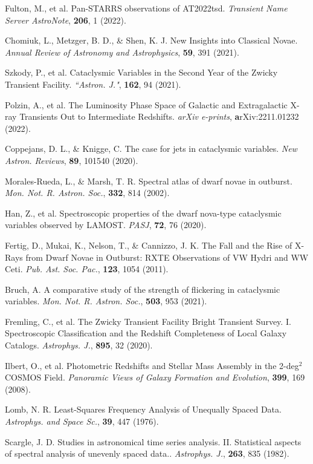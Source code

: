 \documentclass{nature_plusfigure}
\newcommand{\mn}{{Mon. Not. R. Astron. Soc.}}
\newcommand{\nar}{{New Astron. Reviews}}
\newcommand{\mnras}{\mn}
\newcommand{\aj}{{``Astron. J."}}
\newcommand{\apj}{{Astrophys. J.}}
\newcommand{\apss}{{Astrophys. and Space Sc.}}
\newcommand{\pasj}{{PASJ}}
\newcommand{\pasp}{{Pub. Ast. Soc. Pac.}}
\newcommand{\araa}{Annual Review of Astronomy and Astrophysics}
\begin{document}
\begin{methods}
\begin{thebibliography}{10}
 Fulton, M., et al. Pan-STARRS observations of AT2022tsd. \emph{Transient Name Server AstroNote}, \textbf{206}, 1 (2022). 

 Chomiuk, L., Metzger, B. D., \& Shen, K. J. New Insights into Classical Novae. \emph{\araa}, \textbf{59}, 391 (2021). 

 Szkody, P., et al. Cataclysmic Variables in the Second Year of the Zwicky Transient Facility. \emph{\aj}, \textbf{162}, 94 (2021). 

 Polzin, A., et al. The Luminosity Phase Space of Galactic and Extragalactic X-ray Transients Out to Intermediate Redshifts. \emph{arXiv e-prints}, \textbf arXiv:2211.01232 (2022). 

 Coppejans, D. L., \& Knigge, C. The case for jets in cataclysmic variables. \emph{\nar}, \textbf{89}, 101540 (2020). 

 Morales-Rueda, L., \& Marsh, T. R. Spectral atlas of dwarf novae in outburst. \emph{\mnras}, \textbf{332}, 814 (2002). 

 Han, Z., et al. Spectroscopic properties of the dwarf nova-type cataclysmic variables observed by LAMOST. \emph{\pasj}, \textbf{72}, 76 (2020). 

 Fertig, D., Mukai, K., Nelson, T., \& Cannizzo, J. K. The Fall and the Rise of X-Rays from Dwarf Novae in Outburst: RXTE Observations of VW Hydri and WW Ceti. \emph{\pasp}, \textbf{123}, 1054 (2011). 

 Bruch, A. A comparative study of the strength of flickering in cataclysmic variables. \emph{\mnras}, \textbf{503}, 953 (2021). 

 Fremling, C., et al. The Zwicky Transient Facility Bright Transient Survey. I. Spectroscopic Classification and the Redshift Completeness of Local Galaxy Catalogs. \emph{\apj}, \textbf{895}, 32 (2020).

 Ilbert, O., et al. Photometric Redshifts and Stellar Mass Assembly in the 2-deg$^2$ COSMOS Field. \emph{Panoramic Views of Galaxy Formation and Evolution}, \textbf{399}, 169 (2008). 


 Lomb, N. R. Least-Squares Frequency Analysis of Unequally Spaced Data. \emph{\apss}, \textbf{39}, 447 (1976). 

 Scargle, J. D. Studies in astronomical time series analysis. II. Statistical aspects of spectral analysis of unevenly spaced data.. \emph{\apj}, \textbf{263}, 835 (1982). 


\end{thebibliography}
\end{methods}
\end{document}
